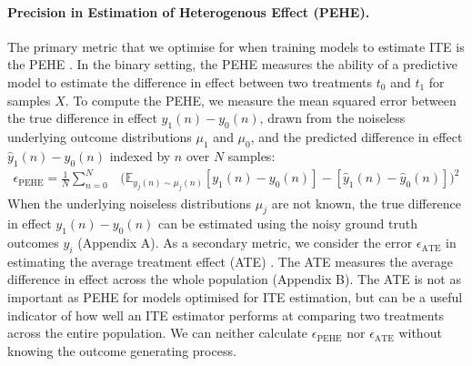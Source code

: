\documentclass{article}
\begin{document}
\paragraph{Precision in Estimation of Heterogenous Effect (PEHE).} The primary metric that we optimise for when training models to estimate ITE is the PEHE \cite{hill2011bayesian}. In the binary setting, the PEHE measures the ability of a predictive model to estimate the difference in effect between two treatments $t_0$ and $t_1$ for samples $X$. To compute the PEHE, we measure the mean squared error between the true difference in effect $y_1(n) - y_0(n)$, drawn from the noiseless underlying outcome distributions $\mu_1$ and $\mu_0$, and the predicted difference in effect $\hat{y}_1(n) - \hat{y}_0(n)$ indexed by $n$ over $N$ samples:
\begin{align}
\label{eq:PEHE} \epsilon_\text{PEHE} = \frac{1}{N}\sum_{n=0}^{N}&\Big( \mathbb{E}_{y_j(n)\sim\mu_j(n)}[y_1(n) - y_0(n)] - [\hat{y}_1(n) - \hat{y}_0(n)] \Big)^2
\end{align}
When the underlying noiseless distributions $\mu_j$ are not known, the true difference in effect $y_1(n) - y_0(n)$ can be estimated using the noisy ground truth outcomes $y_i$ (Appendix A). As a secondary metric, we consider the error $\epsilon_{\text{ATE}}$ in estimating the average treatment effect (ATE) \cite{hill2011bayesian}. The ATE measures the average difference in effect across the whole population (Appendix B). The ATE is not as important as  PEHE for models optimised for ITE estimation, but can be a useful indicator of how well an ITE estimator performs at comparing two treatments across the entire population. We can neither calculate $\epsilon_\text{PEHE}$ nor $\epsilon_\text{ATE}$ without knowing the outcome generating process.
\end{document}
